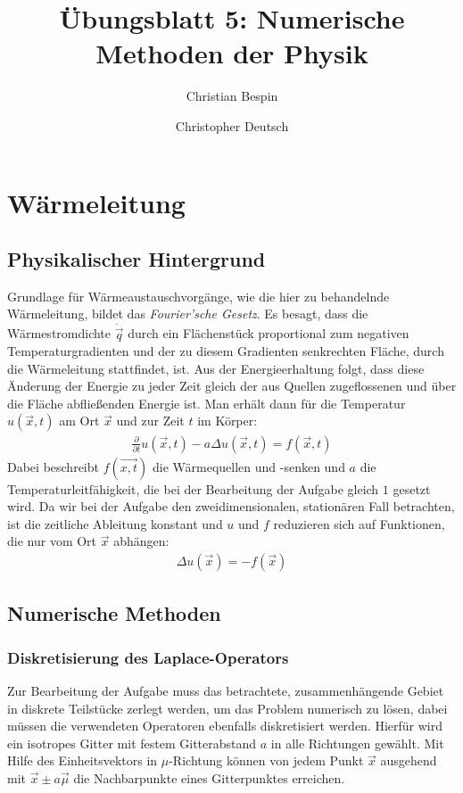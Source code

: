 \documentclass[10pt,a4paper]{article}
\author{Christian Bespin \and Christopher Deutsch}
\title{Übungsblatt 5: Numerische Methoden der Physik}
\begin{document}
\maketitle

\setcounter{section}{4}

\section{Wärmeleitung}

\subsection{Physikalischer Hintergrund}
Grundlage für Wärmeaustauschvorgänge, wie die hier zu behandelnde Wärmeleitung, bildet das \emph{Fourier'sche Gesetz}. Es besagt, dass die Wärmestromdichte $\dot{\vec{q}}$ durch ein Flächenstück proportional zum negativen Temperaturgradienten und der zu diesem Gradienten senkrechten Fläche, durch die Wärmeleitung stattfindet, ist. Aus der Energieerhaltung folgt, dass diese Änderung der Energie zu jeder Zeit gleich der aus Quellen zugeflossenen und über die Fläche abfließenden Energie ist. Man erhält dann für die Temperatur $u(\vec{x},t)$ am Ort $\vec{x}$ und zur Zeit $t$ im Körper:
\begin{align}  
\frac{\partial}{\partial t}u(\vec{x},t)-a \Delta u(\vec{x},t)=f(\vec{x},t)
\end{align}
Dabei beschreibt $f(\vec{x,t})$ die Wärmequellen und -senken und $a$ die Temperaturleitfähigkeit, die bei der Bearbeitung der Aufgabe gleich $1$ gesetzt wird. Da wir bei der Aufgabe den zweidimensionalen, stationären Fall betrachten, ist die zeitliche Ableitung konstant und $u$ und $f$ reduzieren sich auf Funktionen, die nur vom Ort $\vec{x}$ abhängen:
\begin{align}
\Delta u(\vec{x})=-f(\vec{x})
\label{eqn:dgl}
\end{align}

\subsection{Numerische Methoden}
\subsubsection{Diskretisierung des Laplace-Operators}
Zur Bearbeitung der Aufgabe muss das betrachtete, zusammenhängende Gebiet in diskrete Teilstücke zerlegt werden, um das Problem numerisch zu lösen, dabei müssen die verwendeten Operatoren ebenfalls diskretisiert werden. Hierfür wird ein isotropes Gitter mit festem Gitterabstand $a$ in alle Richtungen gewählt. Mit Hilfe des Einheitsvektors in $\mu$-Richtung können von jedem Punkt $\vec{x}$ ausgehend mit $\vec{x} \pm a\vec{\mu}$ die Nachbarpunkte eines Gitterpunktes erreichen.
\end{document}
